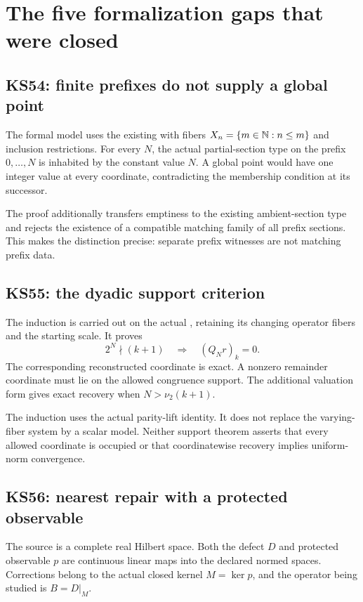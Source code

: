 \documentclass[11pt]{article}
\begin{document}
\section{The five formalization gaps that were closed}
\subsection{KS54: finite prefixes do not supply a global point}
The formal model uses the existing  with fibers \(X_n=\{m\in\mathbb N:n\le m\}\) and inclusion restrictions. For every \(N\), the actual partial-section type on the prefix \(0,\ldots,N\) is inhabited by the constant value \(N\). A global point would have one integer value at every coordinate, contradicting the membership condition at its successor.

The proof additionally transfers emptiness to the existing ambient-section type and rejects the existence of a compatible matching family of all prefix sections. This makes the distinction precise: separate prefix witnesses are not matching prefix data.

\subsection{KS55: the dyadic support criterion}
The induction is carried out on the actual , retaining its changing operator fibers and the starting scale. It proves
\[
 2^N\nmid(k+1)\quad\Longrightarrow\quad (Q_Nr)_k=0.
\]
The corresponding reconstructed coordinate is exact. A nonzero remainder coordinate must lie on the allowed congruence support. The additional valuation form gives exact recovery when \(N>\nu_2(k+1)\).

The induction uses the actual parity-lift identity. It does not replace the varying-fiber system by a scalar model. Neither support theorem asserts that every allowed coordinate is occupied or that coordinatewise recovery implies uniform-norm convergence.

\subsection{KS56: nearest repair with a protected observable}
The source is a complete real Hilbert space. Both the defect \(D\) and protected observable \(p\) are continuous linear maps into the declared normed spaces. Corrections belong to the actual closed kernel \(M=\ker p\), and the operator being studied is \(B=D|_M\).
\end{document}
